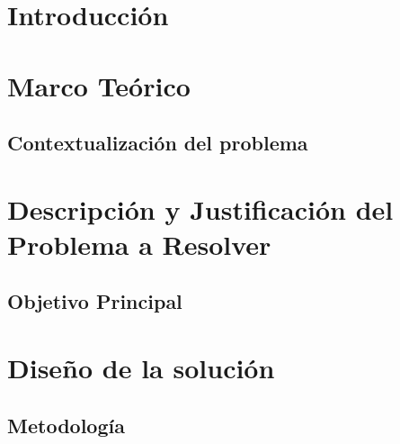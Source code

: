 \documentclass{article}
\begin{document}
\section{Introducción}\label{sec:intr}


\section{Marco Teórico}\label{sec:marc}



\subsection{Contextualización del problema}





\section{Descripción y Justificación del Problema a Resolver}\label{sec:descr}


\subsection{Objetivo Principal}



\section{Diseño de la solución}\label{sec:dis}


\subsection{Metodología}
\end{document}

